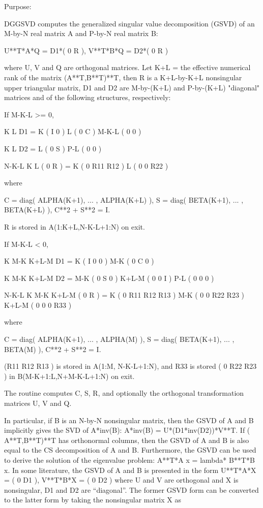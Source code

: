  \begin{DoxyParagraph}{Purpose\+: }
\begin{DoxyVerb} DGGSVD computes the generalized singular value decomposition (GSVD)
 of an M-by-N real matrix A and P-by-N real matrix B:

       U**T*A*Q = D1*( 0 R ),    V**T*B*Q = D2*( 0 R )

 where U, V and Q are orthogonal matrices.
 Let K+L = the effective numerical rank of the matrix (A**T,B**T)**T,
 then R is a K+L-by-K+L nonsingular upper triangular matrix, D1 and
 D2 are M-by-(K+L) and P-by-(K+L) "diagonal" matrices and of the
 following structures, respectively:

 If M-K-L >= 0,

                     K  L
        D1 =     K ( I  0 )
                 L ( 0  C )
             M-K-L ( 0  0 )

                   K  L
        D2 =   L ( 0  S )
             P-L ( 0  0 )

                 N-K-L  K    L
   ( 0 R ) = K (  0   R11  R12 )
             L (  0    0   R22 )

 where

   C = diag( ALPHA(K+1), ... , ALPHA(K+L) ),
   S = diag( BETA(K+1),  ... , BETA(K+L) ),
   C**2 + S**2 = I.

   R is stored in A(1:K+L,N-K-L+1:N) on exit.

 If M-K-L < 0,

                   K M-K K+L-M
        D1 =   K ( I  0    0   )
             M-K ( 0  C    0   )

                     K M-K K+L-M
        D2 =   M-K ( 0  S    0  )
             K+L-M ( 0  0    I  )
               P-L ( 0  0    0  )

                    N-K-L  K   M-K  K+L-M
   ( 0 R ) =     K ( 0    R11  R12  R13  )
               M-K ( 0     0   R22  R23  )
             K+L-M ( 0     0    0   R33  )

 where

   C = diag( ALPHA(K+1), ... , ALPHA(M) ),
   S = diag( BETA(K+1),  ... , BETA(M) ),
   C**2 + S**2 = I.

   (R11 R12 R13 ) is stored in A(1:M, N-K-L+1:N), and R33 is stored
   ( 0  R22 R23 )
   in B(M-K+1:L,N+M-K-L+1:N) on exit.

 The routine computes C, S, R, and optionally the orthogonal
 transformation matrices U, V and Q.

 In particular, if B is an N-by-N nonsingular matrix, then the GSVD of
 A and B implicitly gives the SVD of A*inv(B):
                      A*inv(B) = U*(D1*inv(D2))*V**T.
 If ( A**T,B**T)**T  has orthonormal columns, then the GSVD of A and B is
 also equal to the CS decomposition of A and B. Furthermore, the GSVD
 can be used to derive the solution of the eigenvalue problem:
                      A**T*A x = lambda* B**T*B x.
 In some literature, the GSVD of A and B is presented in the form
                  U**T*A*X = ( 0 D1 ),   V**T*B*X = ( 0 D2 )
 where U and V are orthogonal and X is nonsingular, D1 and D2 are
 ``diagonal''.  The former GSVD form can be converted to the latter
 form by taking the nonsingular matrix X as


\end{DoxyVerb}
\end{DoxyParagraph}
